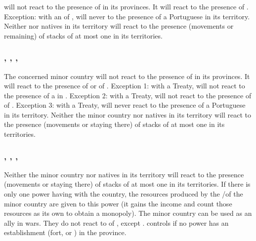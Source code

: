 \subsubsection{}\label{chDiplo:Diplo-vijayanagar}
\aparag {} will not react to the presence of \TP in its
provinces. It will react to the presence of \COL.
\bparag Exception: with an \dipAT of \POR,  will never
to the presence of a Portuguese \COL in its territory.
\aparag Neither  nor natives in its territory will
react to the presence (movements or remaining) of stacks of at most one
\ARMY\faceplus in its territories.

\subsubsection{, , , }
\label{chDiplo:Diplo-mogol}
\label{chDiplo:Diplo-siberie}
\label{chDiplo:Diplo-soudan}
\label{chDiplo:Diplo-afghans}
\aparag The concerned minor country will not react to the presence of
\TP\facemoins in its provinces. It will react to the presence of \COL or
of \TP\faceplus.
\bparag Exception 1: with a Treaty, \paysAfghans will not react to the
presence of a \COL in \provinceHerat.
\bparag Exception 2: with a Treaty, \paysSoudan will not react to the
presence of \COL of \TUR.
\bparag Exception 3: with a Treaty, \paysMogol will never react to the
presence of a Portuguese \COL in its territory.
\aparag Neither the minor country nor natives in its territory will
react to the presence (movements or staying there) of stacks of at most
one \ARMY\faceplus in its territories.

\subsubsection{\paysGujerat, \paysOman, \paysAden,
  \paysaceh}\label{chDiplo:Diplo-aden}\label{chDiplo:Diplo-oman}\label{chDiplo:Diplo-gujarat}\label{chDiplo:Diplo-aceh}
\aparag Neither the minor country nor natives in its territory will
react to the presence (movements or staying there) of stacks of at most
one \ARMY\faceplus in its territories.
\aparag \label{chDiplo:AdenOmanExoticResources} If there is only one
power having \dipAT with the country, the resources produced by the
\TP/\COL of the minor country are given to this power (it gains the
income and count those resources as its own to obtain a monopoly).
\aparag The minor country can be used as an ally in wars.
\aparag They do not react to \COL of \TUR, except \paysaceh.
\aparag \paysOman controls \provinceSocotra if no power has an
establishment (fort, \TP or \COL) in the province.

